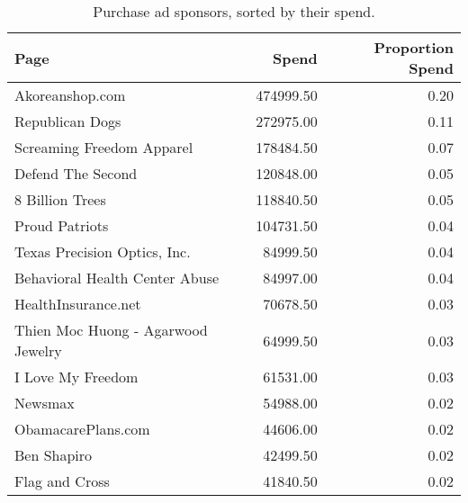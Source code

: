 \begin{table}[ht]
\centering
\begin{tabular}{lrr}
  \hline
Page & Spend & Proportion Spend \\ 
  \hline
Akoreanshop.com & 474999.50 & 0.20 \\ 
  Republican Dogs & 272975.00 & 0.11 \\ 
  Screaming Freedom Apparel & 178484.50 & 0.07 \\ 
  Defend The Second & 120848.00 & 0.05 \\ 
  8 Billion Trees & 118840.50 & 0.05 \\ 
  Proud Patriots & 104731.50 & 0.04 \\ 
  Texas Precision Optics, Inc. & 84999.50 & 0.04 \\ 
  Behavioral Health Center Abuse & 84997.00 & 0.04 \\ 
  HealthInsurance.net & 70678.50 & 0.03 \\ 
  Thien Moc Huong - Agarwood Jewelry & 64999.50 & 0.03 \\ 
  I Love My Freedom & 61531.00 & 0.03 \\ 
  Newsmax & 54988.00 & 0.02 \\ 
  ObamacarePlans.com & 44606.00 & 0.02 \\ 
  Ben Shapiro & 42499.50 & 0.02 \\ 
  Flag and Cross & 41840.50 & 0.02 \\ 
   \hline
\end{tabular}
\caption{Purchase ad sponsors, sorted by their spend.} 
\label{tab:purchase_sponsors}
\end{table}
